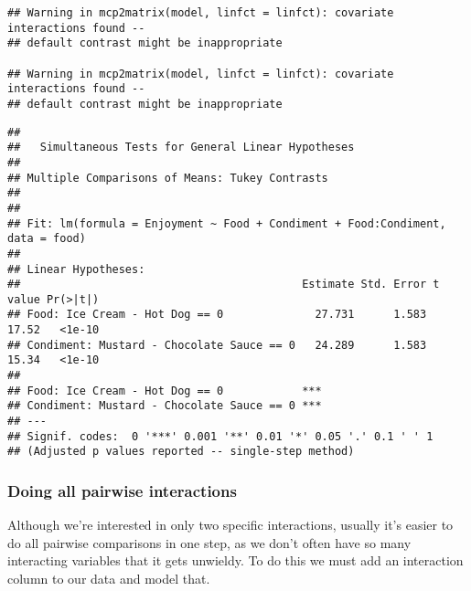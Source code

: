 \documentclass[]{book}
\newenvironment{Shaded}{\begin{snugshade}}{\end{snugshade}}
\newcommand{\DataTypeTok}[1]{\textcolor[rgb]{0.13,0.29,0.53}{#1}}
\newcommand{\DecValTok}[1]{\textcolor[rgb]{0.00,0.00,0.81}{#1}}
\newcommand{\KeywordTok}[1]{\textcolor[rgb]{0.13,0.29,0.53}{\textbf{#1}}}
\newcommand{\NormalTok}[1]{#1}
\newcommand{\OperatorTok}[1]{\textcolor[rgb]{0.81,0.36,0.00}{\textbf{#1}}}
\newcommand{\StringTok}[1]{\textcolor[rgb]{0.31,0.60,0.02}{#1}}
\begin{document}
\begin{verbatim}
## Warning in mcp2matrix(model, linfct = linfct): covariate interactions found --
## default contrast might be inappropriate

## Warning in mcp2matrix(model, linfct = linfct): covariate interactions found --
## default contrast might be inappropriate
\end{verbatim}

\begin{verbatim}
## 
##   Simultaneous Tests for General Linear Hypotheses
## 
## Multiple Comparisons of Means: Tukey Contrasts
## 
## 
## Fit: lm(formula = Enjoyment ~ Food + Condiment + Food:Condiment, data = food)
## 
## Linear Hypotheses:
##                                           Estimate Std. Error t value Pr(>|t|)
## Food: Ice Cream - Hot Dog == 0              27.731      1.583   17.52   <1e-10
## Condiment: Mustard - Chocolate Sauce == 0   24.289      1.583   15.34   <1e-10
##                                              
## Food: Ice Cream - Hot Dog == 0            ***
## Condiment: Mustard - Chocolate Sauce == 0 ***
## ---
## Signif. codes:  0 '***' 0.001 '**' 0.01 '*' 0.05 '.' 0.1 ' ' 1
## (Adjusted p values reported -- single-step method)
\end{verbatim}

\hypertarget{doing-all-pairwise-interactions}{%
\subsubsection{Doing all pairwise interactions}\label{doing-all-pairwise-interactions}}

Although we're interested in only two specific interactions, usually it's easier to do all pairwise comparisons in one step, as we don't often have so many interacting variables that it gets unwieldy. To do this we must add an interaction column to our data and model that.

\begin{Shaded}
\end{Shaded}
\end{document}

